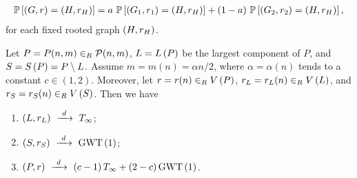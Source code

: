 \begin{align*}
\mathbb{P}\left[\left(G, r\right)=\left(H, r_H\right)\right]=a~\mathbb{P}\left[\left(G_1, r_1\right)=\left(H, r_H\right)\right]+(1-a)~\mathbb{P}\left[\left(G_2, r_2\right)=\left(H, r_H\right)\right],
\end{align*}
for each fixed rooted graph $\left(H, r_H\right)$.
\begin{thm}\label{LSthm:main3}
	Let $P=P(n,m)\in_R\mathcal{P}(n,m)$, $L=L\left(P\right)$ be the largest component of $P$, and $S=S\left(P\right)=P\setminus L$. Assume $m=m(n)=\alpha n/2$, where $\alpha=\alpha(n)$ tends to a constant $c\in (1,2)$. Moreover, let $r=r(n)\in_RV\left(P\right)$, $r_L=r_L(n)\in_RV\left(L\right)$, and $r_S=r_S(n)\in_RV\left(S\right)$. Then we have
	\begin{enumerate}[label=\normalfont(\roman*)]
		\item\label{LSthm:main3A} $\left(L, r_L\right)~\xrightarrow{~d~}~T_\infty$;
		\item\label{LSthm:main3B}
		$\left(S, r_S\right)~\xrightarrow{~d~}~\operatorname{GWT}\left(1\right)$;
		\item\label{LSthm:main3C}
		$\left(P, r\right)~\xrightarrow{~d~}~\left(c-1\right)T_\infty+\left(2-c\right)\operatorname{GWT}\left(1\right)$.
	\end{enumerate}
\end{thm}

